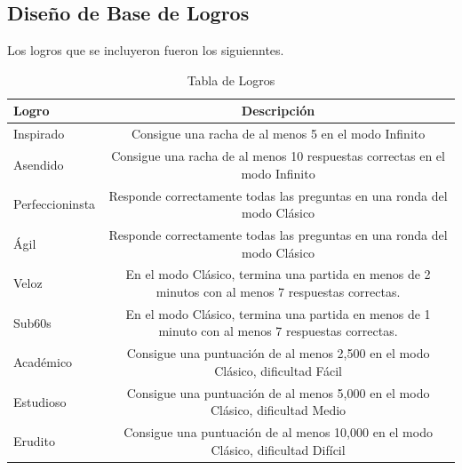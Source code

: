 \documentclass{article}
\begin{document}
\subsection{Diseño de Base de Logros}
Los logros que se incluyeron fueron los siguienntes.

\begin{table}[H]

\begin{tabular}{|M{5cm}|c|}
\hline
Logro & Descripción\\ \hline
Inspirado & Consigue una racha de al menos 5 en el modo Infinito\\ \hline
Asendido & Consigue una racha de al menos 10 respuestas correctas en el modo Infinito\\ \hline
Perfeccioninsta & Responde correctamente todas las preguntas en una ronda del modo Clásico\\ \hline
Ágil &  Responde correctamente todas las preguntas en una ronda del modo Clásico\\ \hline
Veloz & En el modo Clásico, termina una partida en menos de 2 minutos con al menos 7 respuestas correctas.\\ \hline
Sub60s &   En el modo Clásico, termina una partida en menos de 1 minuto con al menos 7 respuestas correctas.\\ \hline
Académico & Consigue una puntuación de al menos 2,500 en el modo Clásico, dificultad Fácil\\ \hline
Estudioso & Consigue una puntuación de al menos 5,000 en el modo Clásico, dificultad Medio\\ \hline
Erudito & Consigue una puntuación de al menos 10,000 en el modo Clásico, dificultad Difícil\\ \hline
	
\end{tabular}
\label{tab:Logros}
\caption{Tabla de Logros}	
\end{table}
\end{document}
